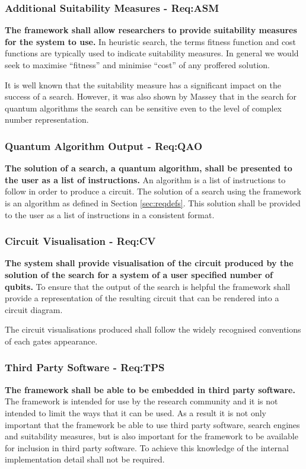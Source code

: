 \subsubsection{Additional Suitability Measures - Req:ASM}
\label{sec:reqasm}
\textbf{The framework shall allow researchers to provide suitability measures for the system to use.}
In heuristic search, the terms fitness function and cost functions are typically used to indicate suitability measures.
In general we would seek to maximise ``fitness'' and minimise ``cost'' of any proffered solution.

It is well known that the suitability measure has a significant impact on the success of a search.
However, it was also shown by Massey\cite{masseythesis} that in the search for quantum algorithms the search can be sensitive even to the level of complex number representation.

\subsubsection{Quantum Algorithm Output - Req:QAO}
\label{sec:reqqao}
\textbf{The solution of a search, a quantum algorithm, shall be presented to the user as a list of instructions.}
An algorithm is a list of instructions to follow in order to produce a circuit.
The solution of a search using the framework is an algorithm as defined in Section \ref{sec:reqdefs}.
This solution shall be provided to the user as a list of instructions in a consistent format.

\subsubsection{Circuit Visualisation  - Req:CV}
\label{sec:reqcv}
\textbf{The system shall provide visualisation of the circuit produced by the solution of the search for a system of a user specified number of qubits.}
To ensure that the output of the search is helpful the framework shall provide a representation of the resulting circuit that can be rendered into a circuit diagram.

The circuit visualisations produced shall follow the widely recognised conventions of each gates appearance.

\subsubsection{Third Party Software - Req:TPS}
\label{sec:reqtps}
\textbf{The framework shall be able to be embedded in third party software.}
The framework is intended for use by the research community and it is not intended to limit the ways that it can be used.
As a result it is not only important that the framework be able to use third party software, search engines and suitability measures, but is also important for the framework to be available for inclusion in third party software.
To achieve this knowledge of the internal implementation detail shall not be required.

